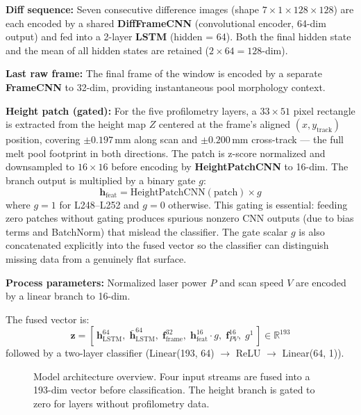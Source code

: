 \documentclass[12pt, letterpaper]{article}
\begin{document}
\textbf{Diff sequence:} Seven consecutive difference images
(shape $7 \times 1 \times 128 \times 128$) are each encoded
by a shared \textbf{DiffFrameCNN} (convolutional encoder,
64-dim output) and fed into a 2-layer \textbf{LSTM}
(hidden = 64). Both the final hidden state and the mean
of all hidden states are retained ($2 \times 64 = 128$-dim).

\textbf{Last raw frame:} The final frame of the window is
encoded by a separate \textbf{FrameCNN} to 32-dim, providing
instantaneous pool morphology context.

\textbf{Height patch (gated):} For the five profilometry
layers, a $33 \times 51$ pixel rectangle is extracted from
the height map $Z$ centered at the frame's aligned
$(x, y_\text{track})$ position, covering $\pm 0.197$\,mm
along scan and $\pm 0.200$\,mm cross-track — the full
melt pool footprint in both directions. The patch is
z-score normalized and downsampled to $16 \times 16$ before
encoding by \textbf{HeightPatchCNN} to 16-dim. The branch
output is multiplied by a binary gate $g$:
\begin{equation}
\mathbf{h}_\text{feat} = \text{HeightPatchCNN}(\text{patch}) \times g
\end{equation}
where $g = 1$ for L248--L252 and $g = 0$ otherwise.
This gating is essential: feeding zero patches without gating
produces spurious nonzero CNN outputs (due to bias terms and
BatchNorm) that mislead the classifier. The gate scalar $g$
is also concatenated explicitly into the fused vector so
the classifier can distinguish missing data from a genuinely
flat surface.

\textbf{Process parameters:} Normalized laser power $P$ and
scan speed $V$ are encoded by a linear branch to 16-dim.

The fused vector is:
\begin{equation}
\mathbf{z} = [\,\mathbf{h}_\text{LSTM}^{64},\;
\bar{\mathbf{h}}_\text{LSTM}^{64},\;
\mathbf{f}_\text{frame}^{32},\;
\mathbf{h}_\text{feat}^{16} \cdot g,\;
\mathbf{f}_{PV}^{16},\;
g^1\,] \in \mathbb{R}^{193}
\end{equation}
followed by a two-layer classifier (Linear(193, 64) $\to$
ReLU $\to$ Linear(64, 1)).

\begin{figure}[H]
\centering
\fbox{\rule{0pt}{5cm}\rule{0.9\linewidth}{0pt}}
\caption{Model architecture overview. Four input streams
are fused into a 193-dim vector before classification.
The height branch is gated to zero for layers without
profilometry data.}
\label{fig:arch}
\end{figure}
\end{document}
